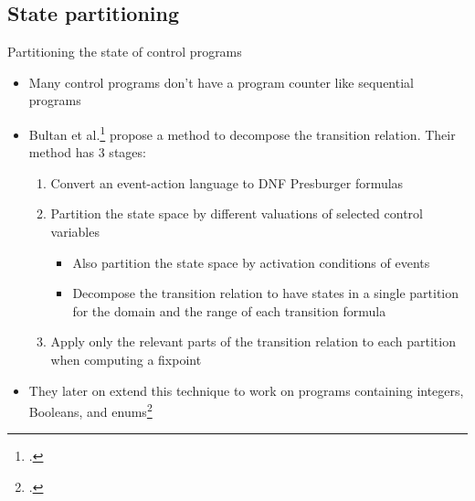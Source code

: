 \documentclass[aspectratio=169]{beamer}
\begin{document}
\subsection{State partitioning}
\begin{frame}{Partitioning the state of control programs}\small
  \begin{itemize}[<+->]
  \item Many control programs don't have a program counter like sequential programs
  \item Bultan et al.\footcite{bultan_model-checking_1999} propose a method to decompose the transition relation. Their method has 3 stages:
    \begin{enumerate}
    \item Convert an event-action language to DNF Presburger formulas
    \item Partition the state space by different valuations of selected control variables
      \begin{itemize}
      \item Also partition the state space by activation conditions of events
      \item Decompose the transition relation to have states in a single partition for the domain and the range of each transition formula
      \end{itemize}
    \item Apply only the relevant parts of the transition relation to each partition when computing a fixpoint
    \end{enumerate}
  \item They later on extend this technique to work on programs containing integers, Booleans, and enums\footcite{bultan_composite_2000}
  \end{itemize}
\end{frame}
\end{document}
